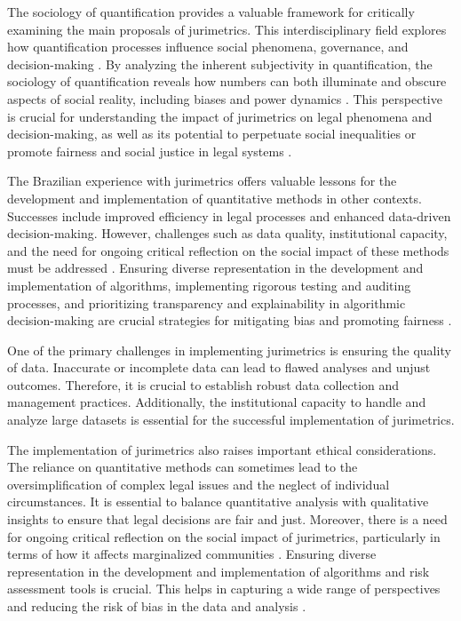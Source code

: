 The sociology of quantification provides a valuable framework for critically examining the main proposals of jurimetrics. This interdisciplinary field explores how quantification processes influence social phenomena, governance, and decision-making \cite{101111lsi12334}. By analyzing the inherent subjectivity in quantification, the sociology of quantification reveals how numbers can both illuminate and obscure aspects of social reality, including biases and power dynamics \cite{101111lsi12334, 101057s4159902003965}. This perspective is crucial for understanding the impact of jurimetrics on legal phenomena and decision-making, as well as its potential to perpetuate social inequalities or promote fairness and social justice in legal systems \cite{101111lsi12334, 101057s4159902003965}.

The Brazilian experience with jurimetrics offers valuable lessons for the development and implementation of quantitative methods in other contexts. Successes include improved efficiency in legal processes and enhanced data-driven decision-making. However, challenges such as data quality, institutional capacity, and the need for ongoing critical reflection on the social impact of these methods must be addressed \cite{10.1007/s11186-021-09453-1,10.3390/fi9040068}. Ensuring diverse representation in the development and implementation of algorithms, implementing rigorous testing and auditing processes, and prioritizing transparency and explainability in algorithmic decision-making are crucial strategies for mitigating bias and promoting fairness \cite{10.1007/s11186-021-09453-1,10.3390/fi9040068}.

One of the primary challenges in implementing jurimetrics is ensuring the quality of data. Inaccurate or incomplete data can lead to flawed analyses and unjust outcomes. Therefore, it is crucial to establish robust data collection and management practices. Additionally, the institutional capacity to handle and analyze large datasets is essential for the successful implementation of jurimetrics.

The implementation of jurimetrics also raises important ethical considerations. The reliance on quantitative methods can sometimes lead to the oversimplification of complex legal issues and the neglect of individual circumstances. It is essential to balance quantitative analysis with qualitative insights to ensure that legal decisions are fair and just. Moreover, there is a need for ongoing critical reflection on the social impact of jurimetrics, particularly in terms of how it affects marginalized communities \cite{10.1007/s11186-021-09453-1,10.3390/fi9040068}. Ensuring diverse representation in the development and implementation of algorithms and risk assessment tools is crucial. This helps in capturing a wide range of perspectives and reducing the risk of bias in the data and analysis \cite{10.1007/s11186-021-09453-1,10.3390/fi9040068}.

